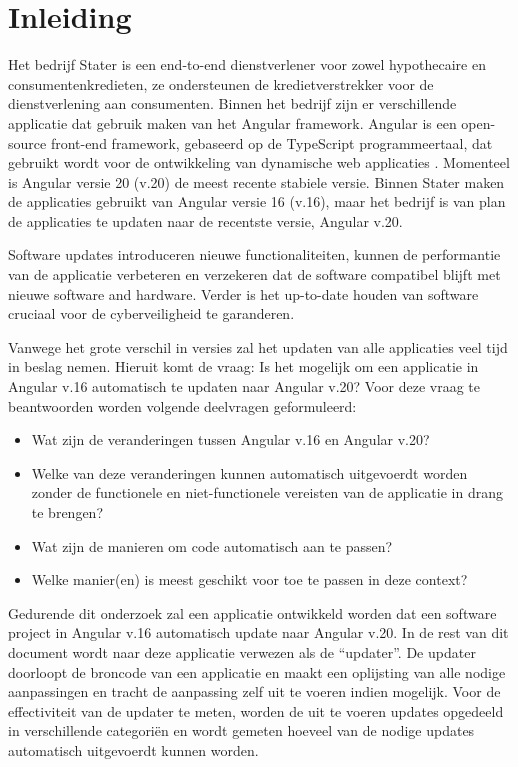
\section{Inleiding}
\label{sec:inleiding}

Het bedrijf Stater is een end-to-end dienstverlener voor zowel hypothecaire en consumentenkredieten, ze ondersteunen de kredietverstrekker voor de dienstverlening aan consumenten.
Binnen het bedrijf zijn er verschillende applicatie dat gebruik maken van het Angular framework.
Angular is een open-source front-end framework, gebaseerd op de TypeScript programmeertaal, dat gebruikt wordt voor de ontwikkeling van dynamische web applicaties \autocite{Cincovic2019}.
Momenteel is Angular versie 20 (v.20) de meest recente stabiele versie.
Binnen Stater maken de applicaties gebruikt van Angular versie 16 (v.16), maar het bedrijf is van plan de applicaties te updaten naar de recentste versie, Angular v.20.

Software updates introduceren nieuwe functionaliteiten, kunnen de performantie van de applicatie verbeteren en verzekeren dat de software compatibel blijft met nieuwe software and hardware.
Verder is het up-to-date houden van software cruciaal voor de cyberveiligheid te garanderen.

Vanwege het grote verschil in versies zal het updaten van alle applicaties veel tijd in beslag nemen.
Hieruit komt de vraag: Is het mogelijk om een applicatie in Angular v.16 automatisch te updaten naar Angular v.20?
Voor deze vraag te beantwoorden worden volgende deelvragen geformuleerd:
\begin{itemize}
  \item Wat zijn de veranderingen tussen Angular v.16 en Angular v.20?
  \item Welke van deze veranderingen kunnen automatisch uitgevoerdt worden zonder de functionele en niet-functionele vereisten van de applicatie in drang te brengen?
  \item Wat zijn de manieren om code automatisch aan te passen?
  \item Welke manier(en) is meest geschikt voor toe te passen in deze context?
\end{itemize}

Gedurende dit onderzoek zal een applicatie ontwikkeld worden dat een software project in Angular v.16 automatisch update naar Angular v.20.
In de rest van dit document wordt naar deze applicatie verwezen als de ``updater''.
De updater doorloopt de broncode van een applicatie en maakt een oplijsting van alle nodige aanpassingen en tracht de aanpassing zelf uit te voeren indien mogelijk.
Voor de effectiviteit van de updater te meten, worden de uit te voeren updates opgedeeld in verschillende categoriën en wordt gemeten hoeveel van de nodige updates automatisch uitgevoerdt kunnen worden.


